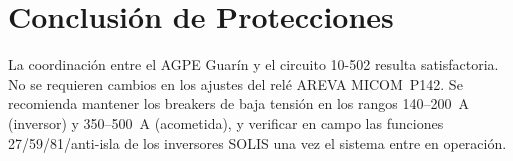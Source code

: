 \section{Conclusión de Protecciones}

La coordinación entre el AGPE Guarín y el circuito 10-502 resulta satisfactoria. No se requieren cambios en los ajustes del relé AREVA MICOM~P142. Se recomienda mantener los breakers de baja tensión en los rangos 140--200~A (inversor) y 350--500~A (acometida), y verificar en campo las funciones 27/59/81/anti-isla de los inversores SOLIS una vez el sistema entre en operación.
